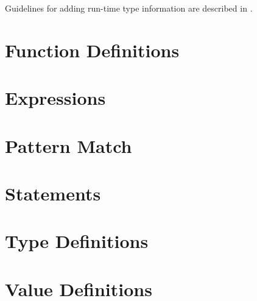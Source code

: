 \documentclass[a4paper,dvips]{article}
\begin{document}
Guidelines for adding run-time type information are described in
\cite{Stroustrup91}. 












\section{Function Definitions}\label{fctdef}



\section{Expressions}\label{expr}



\section{Pattern Match}\label{PM}



\section{Statements}


\section{Type Definitions}
\label{TD}


\section{Value Definitions}


\appendix

%

%

%
\end{document}
